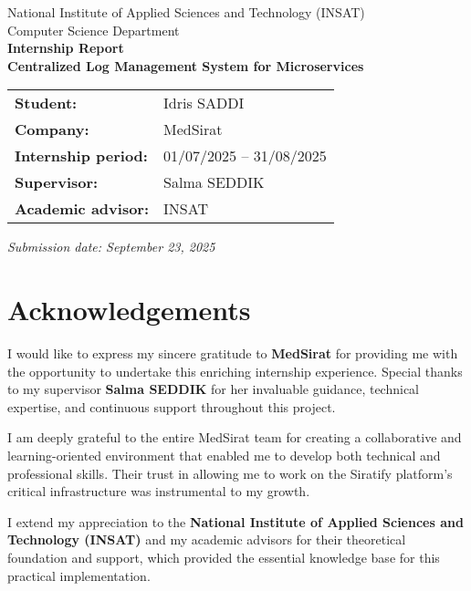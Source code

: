 \documentclass[12pt,a4paper]{report}
\begin{document}
\begin{titlepage}
    \centering
    {\Large National Institute of Applied Sciences and Technology (INSAT)\\[0.25cm]}
    {\large Computer Science Department\\[1.2cm]}
    {\LARGE \textbf{Internship Report}}\\[0.6cm]
    {\Large \textbf{Centralized Log Management System for Microservices}}\\[1.2cm]

  \begin{tabular}{>{\bfseries}p{5cm} p{9cm}}
    Student: & Idris SADDI \\
    Company: & MedSirat \\
    Internship period: & 01/07/2025 -- 31/08/2025 \\
    Supervisor: & Salma SEDDIK \\
    Academic advisor: & INSAT \\
  \end{tabular}

    \vfill

    \vfill
    \large \textit{Submission date: September 23, 2025}
\end{titlepage}

\chapter*{Acknowledgements}

I would like to express my sincere gratitude to \textbf{MedSirat} for providing me with the opportunity to undertake this enriching internship experience. Special thanks to my supervisor \textbf{Salma SEDDIK} for her invaluable guidance, technical expertise, and continuous support throughout this project.

I am deeply grateful to the entire MedSirat team for creating a collaborative and learning-oriented environment that enabled me to develop both technical and professional skills. Their trust in allowing me to work on the Siratify platform's critical infrastructure was instrumental to my growth.

I extend my appreciation to the \textbf{National Institute of Applied Sciences and Technology (INSAT)} and my academic advisors for their theoretical foundation and support, which provided the essential knowledge base for this practical implementation.
\end{document}
